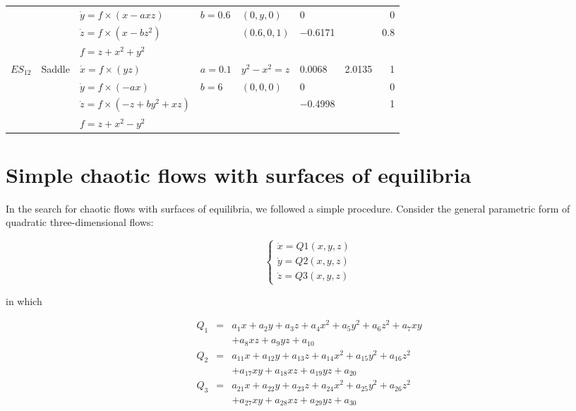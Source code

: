 \begin{table}[htbp]
\begin{tabular}{llllllrr}
 &  & \(\dot{y} = f\times(x − axz)\) & \(b = 0.6\) & \((0, y, 0)\) & 0 &  & 0\\
 &  & \(\dot{z} = f\times(x − bz^2)\) &  & \((0.6, 0, 1)\) & −0.6171 &  & 0.8\\
 &  & \(f = z + x^2 + y^2\) &  &  &  &  & \\
\hline
\(ES_{12}\) & Saddle & \(\dot{x} = f\times(yz)\) & \(a = 0.1\) & \(y^2 − x^2 = z\) & 0.0068 & 2.0135 & 1\\
 &  & \(\dot{y} = f\times(−ax)\) & \(b = 6\) & \((0, 0, 0)\) & 0 &  & 0\\
 &  & \(\dot{z} = f\times(-z + by^2 + xz)\) &  &  & −0.4998 &  & 1\\
 &  & \(f = z + x^2 − y^2\) &  &  &  &  & \\
\hline
\hline
\end{tabular}
\end{table}

\section{Simple chaotic flows with surfaces of equilibria}
\label{sec:org05d73ac}

In the search for chaotic flows with surfaces of equilibria,
we followed a simple procedure. Consider the general
parametric form of quadratic three-dimensional
flows:

\begin{equation}
\label{eq:sur_eq1}
  \left\{
  \begin{array}{l}
  \dot{x} = Q1(x, y, z)\\
  \dot{y} = Q2(x, y, z)\\
  \dot{z} = Q3(x, y, z)
  \end{array}
  \right.
\end{equation}

in which

\begin{eqnarray}
\label{eq:sur_eq2}
  Q_1 &=& a_1x + a_2y+a_3z+a_4x^2 + a_5y^2 + a_6z^2 + a_7xy\\\nonumber
  &&+ a_8xz + a_9yz + a_{10}\\\nonumber
  Q_2 &=& a_{11}x + a_{12}y + a_{13}z + a_{14}x^2 + a_{15}y^2 + a_{16}z^2\\\nonumber
  &&+ a_{17}xy + a_{18}xz + a_{19}yz + a_{20}\\\nonumber
  Q_3 &=& a_{21}x + a_{22}y + a_{23}z + a_{24}x^2 + a_{25}y^2 + a_{26}z^2\\\nonumber 
  && + a_{27}xy + a_{28}xz + a_{29}yz + a_{30}
\end{eqnarray}

